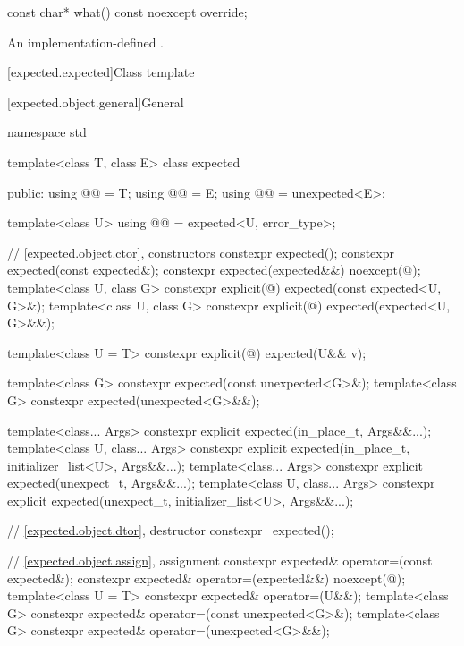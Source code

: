 %
\begin{itemdecl}
const char* what() const noexcept override;
\end{itemdecl}

\begin{itemdescr}
\pnum
\returns
An implementation-defined \ntbs.
\end{itemdescr}

[expected.expected]{Class template }

[expected.object.general]{General}

\begin{codeblock}
namespace std {
  template<class T, class E>
  class expected {
  public:
    using @@ = T;
    using @@ = E;
    using @@ = unexpected<E>;

    template<class U>
    using @@ = expected<U, error_type>;

    // \ref{expected.object.ctor}, constructors
    constexpr expected();
    constexpr expected(const expected&);
    constexpr expected(expected&&) noexcept(@\seebelow@);
    template<class U, class G>
      constexpr explicit(@\seebelow@) expected(const expected<U, G>&);
    template<class U, class G>
      constexpr explicit(@\seebelow@) expected(expected<U, G>&&);

    template<class U = T>
      constexpr explicit(@\seebelow@) expected(U&& v);

    template<class G>
      constexpr expected(const unexpected<G>&);
    template<class G>
      constexpr expected(unexpected<G>&&);

    template<class... Args>
      constexpr explicit expected(in_place_t, Args&&...);
    template<class U, class... Args>
      constexpr explicit expected(in_place_t, initializer_list<U>, Args&&...);
    template<class... Args>
      constexpr explicit expected(unexpect_t, Args&&...);
    template<class U, class... Args>
      constexpr explicit expected(unexpect_t, initializer_list<U>, Args&&...);

    // \ref{expected.object.dtor}, destructor
    constexpr ~expected();

    // \ref{expected.object.assign}, assignment
    constexpr expected& operator=(const expected&);
    constexpr expected& operator=(expected&&) noexcept(@\seebelow@);
    template<class U = T> constexpr expected& operator=(U&&);
    template<class G>
      constexpr expected& operator=(const unexpected<G>&);
    template<class G>
      constexpr expected& operator=(unexpected<G>&&);

}}
\end{codeblock}
